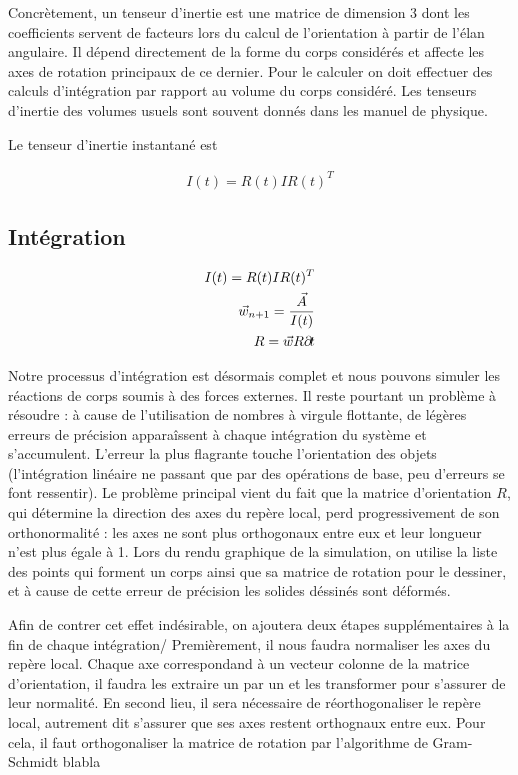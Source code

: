 Concrètement, un tenseur d'inertie est une matrice de dimension 3 dont les coefficients servent de facteurs lors du calcul de l'orientation à partir de l'élan angulaire. Il dépend directement de la forme du corps considérés et affecte les axes de rotation principaux de ce dernier. Pour le calculer on doit effectuer des calculs d'intégration par rapport au volume du corps considéré. Les tenseurs d'inertie des volumes usuels sont souvent donnés dans les manuel de physique.

Le tenseur d'inertie instantané est

\begin{align*}
  I(t) = R(t) I R(t)^T
\end{align*}

\subsection{Intégration}

\begin{align*}
  I(t) = R(t) I R(t)^T \\
  \vec{w}_{n+1} = \frac{\vec{A}}{I(t)} \\
  R = \vec{w} R \partial \! t
\end{align*}

Notre processus d'intégration est désormais complet et nous pouvons simuler les réactions de corps soumis à des forces externes. Il reste pourtant un problème à résoudre : à cause de l'utilisation de nombres à virgule flottante, de légères erreurs de précision apparaîssent à chaque intégration du système et s'accumulent. L'erreur la plus flagrante touche l'orientation des objets (l'intégration linéaire ne passant que par des opérations de base, peu d'erreurs se font ressentir). Le problème principal vient du fait que la matrice d'orientation $R$, qui détermine la direction des axes du repère local, perd progressivement de son orthonormalité : les axes ne sont plus orthogonaux entre eux et leur longueur n'est plus égale à 1. Lors du rendu graphique de la simulation, on utilise la liste des points qui forment un corps ainsi que sa matrice de rotation pour le dessiner, et à cause de cette erreur de précision les solides déssinés sont déformés.

Afin de contrer cet effet indésirable, on ajoutera deux étapes supplémentaires à la fin de chaque intégration/ Premièrement, il nous faudra  normaliser les axes du repère local. Chaque axe correspondand à un vecteur colonne de la matrice d'orientation, il faudra les extraire un par un et les transformer pour s'assurer de leur normalité. En second lieu, il sera nécessaire de réorthogonaliser le repère local, autrement dit s'assurer que ses axes restent orthognaux entre eux. Pour cela, il faut orthogonaliser la matrice de rotation par l'algorithme de Gram-Schmidt blabla
